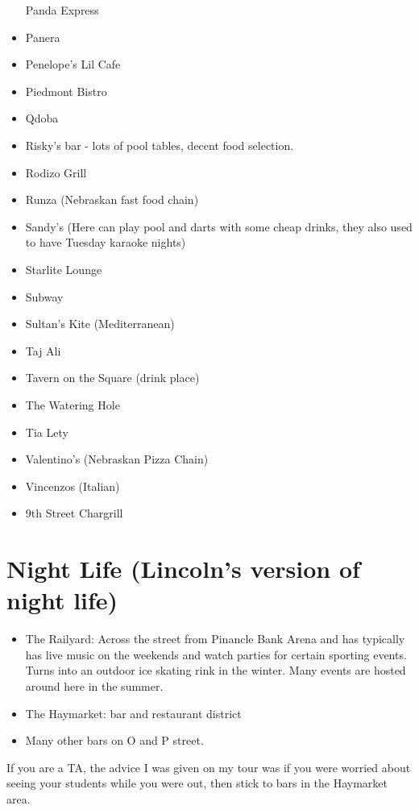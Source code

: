 \documentclass[
  12pt,
]{book}
\providecommand{\tightlist}{%
  \setlength{\itemsep}{0pt}\setlength{\parskip}{0pt}}
\begin{document}
\begin{itemize}
  Panda Express
\item
  Panera
\item
  Penelope's Lil Cafe
\item
  Piedmont Bistro
\item
  Qdoba
\item
  Risky's bar - lots of pool tables, decent food selection.
\item
  Rodizo Grill
\item
  Runza (Nebraskan fast food chain)
\item
  Sandy's (Here can play pool and darts with some cheap drinks, they also used to have Tuesday karaoke nights)
\item
  Starlite Lounge
\item
  Subway
\item
  Sultan's Kite (Mediterranean)
\item
  Taj Ali
\item
  Tavern on the Square (drink place)
\item
  The Watering Hole
\item
  Tia Lety
\item
  Valentino's (Nebraskan Pizza Chain)
\item
  Vincenzos (Italian)
\item
  9th Street Chargrill
\end{itemize}

\hypertarget{night-life-lincolns-version-of-night-life}{%
\section{Night Life (Lincoln's version of night life)}\label{night-life-lincolns-version-of-night-life}}

\begin{itemize}
\tightlist
\item
  The Railyard: Across the street from Pinancle Bank Arena and has typically has live music on the weekends and watch parties for certain sporting events. Turns into an outdoor ice skating rink in the winter. Many events are hosted around here in the summer.
\item
  The Haymarket: bar and restaurant district
\item
  Many other bars on O and P street.
\end{itemize}

If you are a TA, the advice I was given on my tour was if you were worried about seeing your students while you were out, then stick to bars in the Haymarket area.
\end{document}

